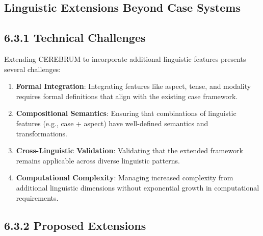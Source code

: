 \documentclass[
  11pt,
  letterpaper,
]{article}
\providecommand{\tightlist}{%
  \setlength{\itemsep}{0pt}\setlength{\parskip}{0pt}}
\begin{document}
\hypertarget{linguistic-extensions-beyond-case-systems}{%
\subsection{Linguistic Extensions Beyond Case
Systems}\label{linguistic-extensions-beyond-case-systems}}

\hypertarget{technical-challenges-2}{%
\subsection{6.3.1 Technical Challenges}\label{technical-challenges-2}}

Extending CEREBRUM to incorporate additional linguistic features
presents several challenges:

\begin{enumerate}
\def\labelenumi{\arabic{enumi}.}
\tightlist
\item
  \textbf{Formal Integration}: Integrating features like aspect, tense,
  and modality requires formal definitions that align with the existing
  case framework.
\item
  \textbf{Compositional Semantics}: Ensuring that combinations of
  linguistic features (e.g., case + aspect) have well-defined semantics
  and transformations.
\item
  \textbf{Cross-Linguistic Validation}: Validating that the extended
  framework remains applicable across diverse linguistic patterns.
\item
  \textbf{Computational Complexity}: Managing increased complexity from
  additional linguistic dimensions without exponential growth in
  computational requirements.
\end{enumerate}

\hypertarget{proposed-extensions}{%
\subsection{6.3.2 Proposed Extensions}\label{proposed-extensions}}
\end{document}
